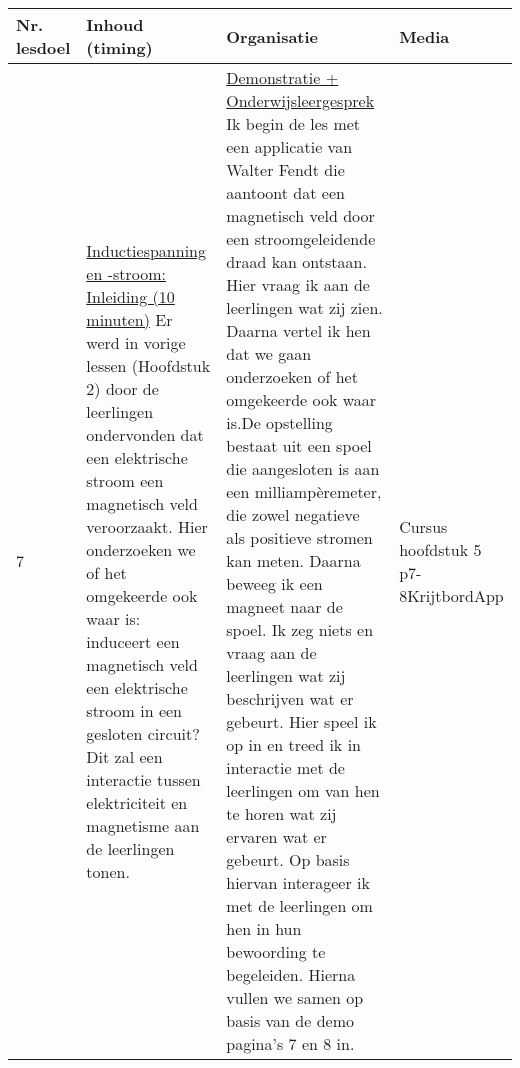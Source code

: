 \begin{landscape}
\begin{tabularx}{1.56\textwidth}{|p{1.5cm}|p{9cm}|X|p{4cm}|}
	\hline
	\textbf{Nr. lesdoel } & \textbf{Inhoud (timing)}  & \textbf{Organisatie } & \textbf{Media } \\ \hline
	7\newline\newline 8& \underline{Inductiespanning en -stroom:} \underline{Inleiding (10 minuten)}\newline
	Er werd in vorige lessen (Hoofdstuk 2) door de leerlingen ondervonden dat een elektrische stroom een magnetisch veld veroorzaakt. Hier onderzoeken we of het omgekeerde ook waar is: induceert een magnetisch veld een elektrische stroom in een gesloten circuit? Dit zal een interactie tussen elektriciteit en magnetisme aan de leerlingen tonen.
	&  \underline{Demonstratie + Onderwijsleergesprek}\newline 
	Ik begin de les met een applicatie van Walter Fendt die aantoont dat een magnetisch veld door een stroomgeleidende draad kan ontstaan. Hier vraag ik aan de leerlingen wat zij zien. Daarna vertel ik hen dat we gaan onderzoeken of het omgekeerde ook waar is.\newline De opstelling bestaat uit een spoel die aangesloten is aan een milliampèremeter, die zowel negatieve als positieve stromen kan meten. Daarna beweeg ik een magneet naar de spoel. Ik zeg niets en vraag aan de leerlingen wat zij beschrijven wat er gebeurt. Hier speel ik op in en treed ik in interactie met de leerlingen om van hen te horen wat zij ervaren wat er gebeurt.	Op basis hiervan interageer ik met de leerlingen om hen in hun bewoording te begeleiden. Hierna vullen we samen op basis van de demo pagina's 7 en 8 in.
	&  Cursus hoofdstuk 5 p7-8\newline\newline Krijtbord\newline\newline App
	\\ \hline
\end{tabularx}\vspace{5mm}





\end{landscape}
